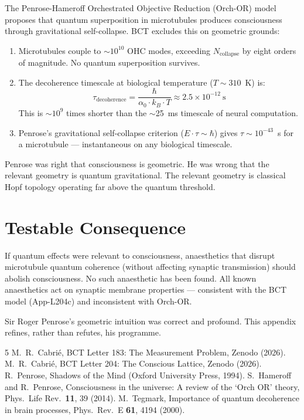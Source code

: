 \documentclass[aps,prl,twocolumn,superscriptaddress]{revtex4-2}
\begin{document}
The Penrose-Hameroff Orchestrated Objective Reduction (Orch-OR) model proposes that quantum superposition in microtubules produces consciousness through gravitational self-collapse. BCT excludes this on geometric grounds:

\begin{enumerate}
\item Microtubules couple to $\sim 10^{10}$ OHC modes, exceeding $N_{\mathrm{collapse}}$ by eight orders of magnitude. No quantum superposition survives.
\item The decoherence timescale at biological temperature ($T \sim 310$~K) is:
\begin{equation}
\tau_{\mathrm{decoherence}} = \frac{\hbar}{\alpha_0 \cdot k_B \cdot T} \approx 2.5 \times 10^{-12}~\text{s}
\end{equation}
This is $\sim 10^9$ times shorter than the $\sim$25~ms timescale of neural computation.
\item Penrose's gravitational self-collapse criterion ($E \cdot \tau \sim \hbar$) gives $\tau \sim 10^{-43}$~s for a microtubule --- instantaneous on any biological timescale.
\end{enumerate}

Penrose was right that consciousness is geometric. He was wrong that the relevant geometry is quantum gravitational. The relevant geometry is classical Hopf topology operating far above the quantum threshold.

\section{Testable Consequence}

If quantum effects were relevant to consciousness, anaesthetics that disrupt microtubule quantum coherence (without affecting synaptic transmission) should abolish consciousness. No such anaesthetic has been found. All known anaesthetics act on synaptic membrane properties --- consistent with the BCT model (App-L204c) and inconsistent with Orch-OR.

\begin{acknowledgments}
Sir Roger Penrose's geometric intuition was correct and profound. This appendix refines, rather than refutes, his programme.
\end{acknowledgments}

\begin{thebibliography}{5}
 M.~R.~Cabri\'e, BCT Letter 183: The Measurement Problem, Zenodo (2026).
 M.~R.~Cabri\'e, BCT Letter 204: The Conscious Lattice, Zenodo (2026).
 R.~Penrose, Shadows of the Mind (Oxford University Press, 1994).
 S.~Hameroff and R.~Penrose, Consciousness in the universe: A review of the `Orch OR' theory, Phys.\ Life Rev.\ \textbf{11}, 39 (2014).
 M.~Tegmark, Importance of quantum decoherence in brain processes, Phys.\ Rev.\ E \textbf{61}, 4194 (2000).
\end{thebibliography}
\end{document}
